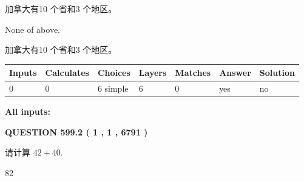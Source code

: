 \documentclass{ctexart}
\begin{document}
 
加拿大有10 个省和3 个地区。
 
 
 None of above.
 
 
\noindent{}
 
 
加拿大有10 个省和3 个地区。
 
 
\noindent{}
 
 
   
   
   
   
\noindent\begin{tabular}{|l|l|l|l|l|l|l|}
 \hline
Inputs & Calculates & Choices & Layers & Matches & Answer & Solution \\ \hline
 0  & 
 0  & 
 6
  simple  
  & 
 6  & 
 0  & 
  yes & 
  no 
  \\ \hline
 \end{tabular}
   
   
   
   
\noindent{}
   
   
   
   
\noindent\vspace{0.1in}\hspace{-0.08in} {\textbf{\Large{All inputs: }}}
   
   
  
\vspace{0.2in}
  
{\textbf{\Large{QUESTION
599.2 
 ( 1 , 1 , 6791 )
}}}
  
  
 
请计算 $ %
42 +  %
40 $.
 
 
 
\noindent{}
 
 

82
 
 
\noindent{}
 
 

 
 
 
\noindent{}
 
 
\end{document}
